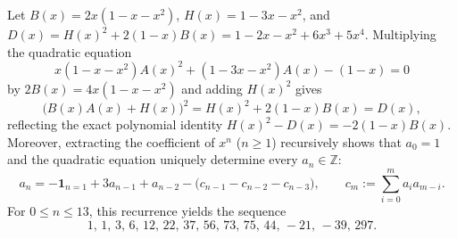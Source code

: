 \documentclass[11pt,a4paper]{article}
\theoremstyle{definition}
\theoremstyle{remark}
\newcommand{\Z}{\mathbb{Z}}
\begin{document}
Let $B(x) = 2x(1 - x - x^2)$, $H(x) = 1 - 3x - x^2$, and $D(x) = H(x)^2 + 2(1 - x) B(x) = 1 - 2x - x^2 + 6x^3 + 5x^4$. Multiplying the quadratic equation
\[
  x(1 - x - x^2) A(x)^2 + (1 - 3x - x^2) A(x) - (1 - x) = 0
\]
by $2 B(x) = 4x(1 - x - x^2)$ and adding $H(x)^2$ gives
\[
  \bigl(B(x) A(x) + H(x)\bigr)^2 = H(x)^2 + 2(1-x) B(x) = D(x),
\]
reflecting the exact polynomial identity $H(x)^2 - D(x) = -2(1-x)B(x)$. Moreover, extracting the coefficient of $x^n$ ($n \ge 1$) recursively shows that $a_0 = 1$ and the quadratic equation uniquely determine every $a_n \in \Z$:
\[
  a_n = -\mathbf{1}_{n=1} + 3 a_{n-1} + a_{n-2} - \bigl(c_{n-1} - c_{n-2} - c_{n-3}\bigr), \qquad c_m := \sum_{i=0}^{m} a_i a_{m-i}.
\]
For $0 \le n \le 13$, this recurrence yields the sequence
\[
  1,\, 1,\, 3,\, 6,\, 12,\, 22,\, 37,\, 56,\, 73,\, 75,\, 44,\, -21,\, -39,\, 297.
\]
\end{document}
